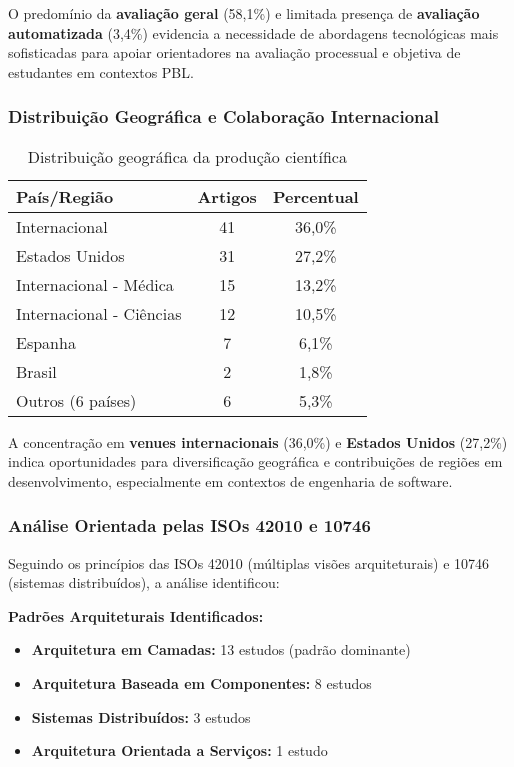 \documentclass[english, spanish, brazilian]{RBIEarticle} %
\begin{document}
O predomínio da \textbf{avaliação geral} (58,1\%) e limitada presença de \textbf{avaliação automatizada} (3,4\%) evidencia a necessidade de abordagens tecnológicas mais sofisticadas para apoiar orientadores na avaliação processual e objetiva de estudantes em contextos PBL.

\subsubsection{Distribuição Geográfica e Colaboração Internacional}

\begin{table}[htbp]
\centering
\caption{Distribuição geográfica da produção científica}
\label{tab:geografica}
\begin{tabular}{lcc}
\toprule
\textbf{País/Região} & \textbf{Artigos} & \textbf{Percentual} \\
\midrule
Internacional & 41 & 36,0\% \\
Estados Unidos & 31 & 27,2\% \\
Internacional - Médica & 15 & 13,2\% \\
Internacional - Ciências & 12 & 10,5\% \\
Espanha & 7 & 6,1\% \\
Brasil & 2 & 1,8\% \\
Outros (6 países) & 6 & 5,3\% \\
\bottomrule
\end{tabular}
\end{table}

A concentração em \textbf{venues internacionais} (36,0\%) e \textbf{Estados Unidos} (27,2\%) indica oportunidades para diversificação geográfica e contribuições de regiões em desenvolvimento, especialmente em contextos de engenharia de software.

\subsubsection{Análise Orientada pelas ISOs 42010 e 10746}

Seguindo os princípios das ISOs 42010 (múltiplas visões arquiteturais) e 10746 (sistemas distribuídos), a análise identificou:

\textbf{Padrões Arquiteturais Identificados:}
\begin{itemize}
\item \textbf{Arquitetura em Camadas:} 13 estudos (padrão dominante)
\item \textbf{Arquitetura Baseada em Componentes:} 8 estudos  
\item \textbf{Sistemas Distribuídos:} 3 estudos
\item \textbf{Arquitetura Orientada a Serviços:} 1 estudo
\end{itemize}
\end{document}
